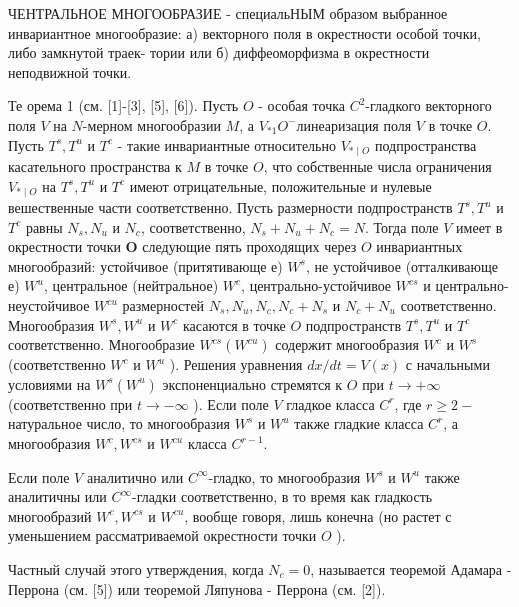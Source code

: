 \documentclass[10pt]{article}
\begin{document}
ЧЕНТРАЛЬНОЕ МНОГООБРАЗИЕ - специальНЫМ образом выбранное инвариантное многообразие: а) векторного поля в окрестности особой точки, либо замкнутой траек- тории или б) диффеоморфизма в окрестности неподвижной точки.



Те орема 1 (см. [1]-[3], [5], [6]). Пусть $O$ - особая точка $C^{2}$-гладкого векторного поля $V$ на $N$-мерном многообразии $M$, а $V_{* 1} O^{-}$линеаризация поля $V$ в точке $O$. Пусть $T^{s}, T^{u}$ и $T^{c}$ - такие инвариантные относительно $V_{* \mid O}$ подпространства касательного пространства к $M$ в точке $O$, что собственные числа ограничения $V_{* \mid O}$ на $T^{s}, T^{u}$ и $T^{c}$ имеют отрицательные, положительные и нулевые вешественные части соответственно. Пусть размерности подпространств $T^{s}, T^{u}$ и $T^{c}$ равны $N_{s}, N_{u}$ и $N_{c}$, соответственно, $N_{s}+N_{u}+N_{c}=N$. Тогда поле $V$ имеет в окрестности точки $\boldsymbol{O}$ следующие пять проходящих через $O$ инвариантных многообразий: устойчивое (притятивающе е) $W^{s}$, не устойчивое (отталкивающе е) $W^{u}$, центральное (нейтральное) $W^{c}$, центрально-устойчивое $W^{c s}$ и центрально-неустойчивое $W^{c u}$ размерностей $N_{s}, N_{u}, N_{c}, N_{c}+N_{s}$ и $N_{c}+N_{u}$ соответственно. Многообразия $W^{s}, W^{u}$ и $W^{c}$ касаются в точке $O$ подпространств $T^{s}, T^{u}$ и $T^{c}$ соответственно. Многообразие $W^{c s}\left(W^{c u}\right)$ содержит многообразия $W^{c}$ и $W^{s}$ (соответственно $W^{c}$ и $W^{u}$ ). Решения уравнения $d x / d t=V(x)$ с начальными условиями на $W^{s}\left(W^{u}\right)$ экспоненциально стремятся к $O$ при $t \rightarrow+\infty$ (соответственно при $t \rightarrow-\infty$ ). Если поле $V$ гладкое класса $C^{r}$, где $r \geqslant 2-$ натуральное число, то многообразия $W^{s}$ и $W^{u}$ также гладкие класса $C^{r}$, а многообразия $W^{c}, W^{c s}$ и $W^{c u}$ класса $C^{r-1}$.



Если поле $V$ аналитично или $C^{\infty}$-гладко, то многообразия $W^{s}$ и $W^{u}$ также аналитичны или $C^{\infty}$-гладки соответственно, в то время как гладкость многообразий $W^{c}, W^{c s}$ и $W^{c u}$, вообще говоря, лишь конечна (но растет с уменьшением рассматриваемой окрестности точки $O$ ).



Частный случай этого утверждения, когда $N_{c}=0$, называется теоремой Адамара - Перрона (см. [5]) или теоремой Ляпунова - Перрона (см. [2]).
\end{document}
